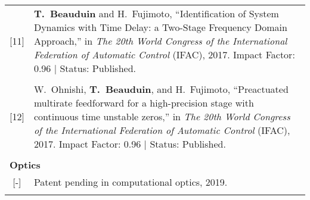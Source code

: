 \documentclass[a4paper,10pt]{article}
\begin{document}
\begin{tabularx}{\textwidth}{cX}
[11] & \textbf{T.~Beauduin} and H.~Fujimoto, ``{Identification of System Dynamics with Time Delay: 
	a Two-Stage Frequency Domain Approach},'' in \emph{The 20th World Congress of the 
	International Federation of Automatic Control} (IFAC), 2017.
	Impact Factor: 0.96 | Status: Published. \\
	& \\

[12] & W.~Ohnishi, \textbf{T.~Beauduin}, and H.~Fujimoto, ``{Preactuated multirate feedforward
	for a high-precision stage with continuous time unstable zeros},'' in
	\emph{The 20th World Congress of the International Federation of Automatic Control} (IFAC), 2017.
	Impact Factor: 0.96 | Status: Published. \\
	& \\

\multicolumn{2}{l}{\textbf{Optics}} \\

[-] & Patent pending in computational optics, 2019. \\
& \\

\end{tabularx}

%
\end{document}
